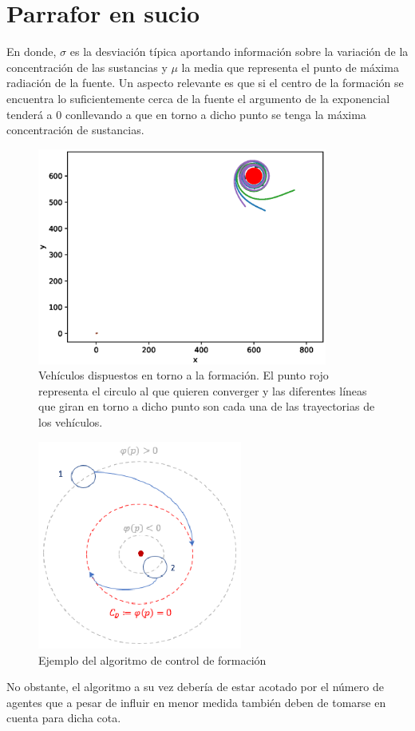 \newpage
\thispagestyle{empty}
\mbox{}

\chapter{Parrafor en sucio}
\label{ch:chapter6}


En donde, $\sigma$ es la desviación típica aportando información sobre la variación de la concentración de las sustancias y $\mu$ la media que representa el punto de máxima radiación de la fuente. Un aspecto relevante es que si el centro de la formación se encuentra lo suficientemente cerca de la fuente el argumento de la exponencial tenderá a 0 conllevando a que en torno a dicho punto se tenga la máxima concentración de sustancias.

\begin{figure}[htb]
\centering
\includegraphics[width=0.85\textwidth]{figures/Coordinacion/Objetivo_Final.eps}
\caption{Vehículos dispuestos en torno a la formación. El punto rojo representa el circulo al que quieren converger y las diferentes líneas que giran en torno a dicho punto son cada una de las trayectorias de los vehículos.} \label{Ejemplo_Coordinacion}
\end{figure}

\begin{figure}[htb]
\centering
\includegraphics[width=0.60\textwidth]{figures/Pruea_Coordinacion.eps}
\caption{Ejemplo del algoritmo de control de formación} \label{Ejemplo_Coordinacion}
\end{figure}

No obstante, el algoritmo a su vez debería de estar acotado por el número de agentes que a pesar de influir en menor medida también deben de tomarse en cuenta para dicha cota.